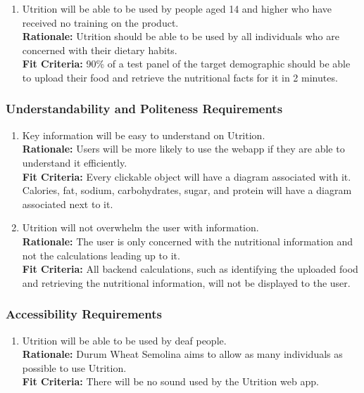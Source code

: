 \documentclass[12pt]{article}
\begin{document}
\begin{enumerate}[{UH}3. ] 
	\item Utrition will be able to be used by people aged 14 and higher who have received no training on the product.\\
	\textbf{Rationale:} Utrition should be able to be used by all individuals who are concerned with their dietary habits.\\
	\textbf{Fit Criteria:} 90\% of a test panel of the target demographic should be able to upload their food and retrieve the nutritional facts for it in 2 minutes.
\end{enumerate}

\subsubsection{Understandability and Politeness Requirements}

\begin{enumerate}[start=4,label={UH\arabic*.}]
	\item Key information will be easy to understand on Utrition.\\
	\textbf{Rationale:} Users will be more likely to use the webapp if they are able to understand it efficiently.\\
	\textbf{Fit Criteria:} Every clickable object will have a diagram associated with it. Calories, fat, sodium, carbohydrates, sugar, and protein will have a diagram associated next to it.
	\item Utrition will not overwhelm the user with information.\\
	\textbf{Rationale:} The user is only concerned with the nutritional information and not the calculations leading up to it.\\
	\textbf{Fit Criteria:} All backend calculations, such as identifying the uploaded food and retrieving the nutritional information, will not be displayed to the user.
\end{enumerate}

\subsubsection{Accessibility Requirements}

\begin{enumerate}[{UH}6. ] 
	\item Utrition will be able to be used by deaf people.\\
	\textbf{Rationale:} Durum Wheat Semolina aims to allow as many individuals as possible to use Utrition.\\
	\textbf{Fit Criteria:} There will be no sound used by the Utrition web app. 
\end{enumerate}
\end{document}
